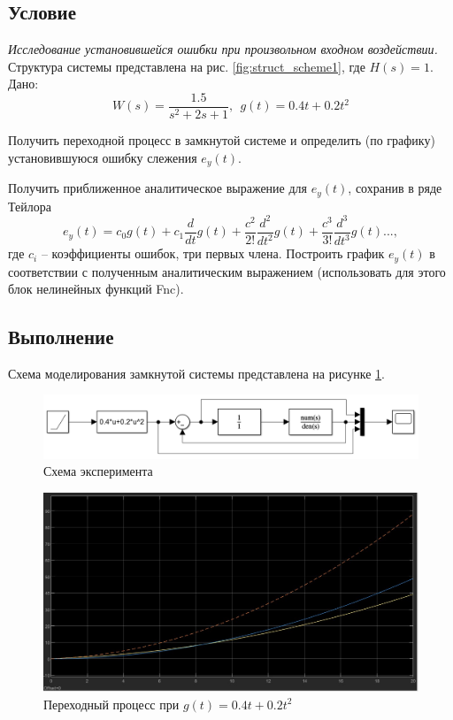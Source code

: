 \documentclass[a4paper, 12pt]{article}
\begin{document}
    \subsection{Условие}
    \textit{Исследование установившейся ошибки при произвольном входном воздействии.}
    Структура системы представлена на рис. \ref{fig:struct_scheme1}, где $H(s)=1$. Дано:
    $$W(s)=\dfrac{1.5}{s^2+2s+1},\ \ g(t)=0.4t+0.2t^2$$
    \begin{compactitem}
    \item Получить переходной процесс в замкнутой системе
    и определить (по графику) установившуюся ошибку слежения $e_y(t)$.
    \item Получить приближенное аналитическое выражение для $e_y(t)$, сохранив в
    ряде Тейлора $$e_y(t)=c_0g(t)+c_1\dfrac{d}{dt}g(t)+\dfrac{c^2}{2!}\dfrac{d^2}{dt^2}g(t)+\dfrac{c^3}{3!}\dfrac{d^3}{dt^3}g(t)...,$$
    где $c_i$ -- коэффициенты ошибок, три первых члена. Построить график $e_y(t)$
    в соответствии с полученным аналитическим выражением (использовать для этого блок нелинейных функций Fnc).
    \end{compactitem}


    \subsection{Выполнение}
    Схема моделирования замкнутой системы представлена на рисунке \ref{fig:scheme4_1}.
    \begin{figure}[H]
        \centering
        \includegraphics[scale=0.6]{scheme4_1.png}
        \captionsetup{skip=0pt}
        \caption{Схема эксперимента}
        \label{fig:scheme4_1}
    \end{figure}
    \begin{figure}[H]
        \centering
        \includegraphics[scale=0.3]{task_4_1.jpg}
        \captionsetup{skip=0pt}
        \caption{Переходный процесс при $g(t)=0.4t+0.2t^2$}
        \label{fig:task_4_1}
    \end{figure}
\end{document}
